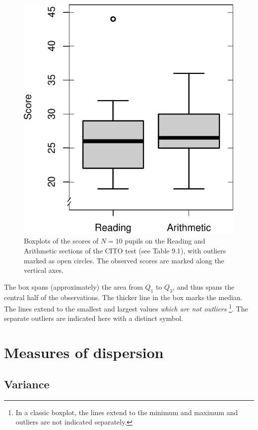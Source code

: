 \documentclass[
]{book}
\begin{document}
\begin{figure}
\centering
\includegraphics{QMS-EN_files/figure-latex/cito-boxplot-1.pdf}
\caption{\label{fig:cito-boxplot}Boxplots of the scores of \(N=10\) pupils on the Reading and Arithmetic sections of the CITO test (see Table 9.1), with outliers marked as open circles. The observed scores are marked along the vertical axes.}
\end{figure}

The box spans (approximately) the area from \(Q_1\) to \(Q_3\), and
thus spans the central half of the observations. The thicker line in the
box marks the median. The lines extend to the smallest and largest
values \emph{which are not outliers} \footnote{In a classic boxplot, the lines extend to the minimum and maximum \citep{Tukey77} and
  outliers are not indicated separately.}. The separate outliers
are indicated here with a distinct symbol.

\hypertarget{sec:measures-of-dispersion}{%
\section{Measures of dispersion}\label{sec:measures-of-dispersion}}

\hypertarget{sec:variance}{%
\subsection{Variance}\label{sec:variance}}
\end{document}
